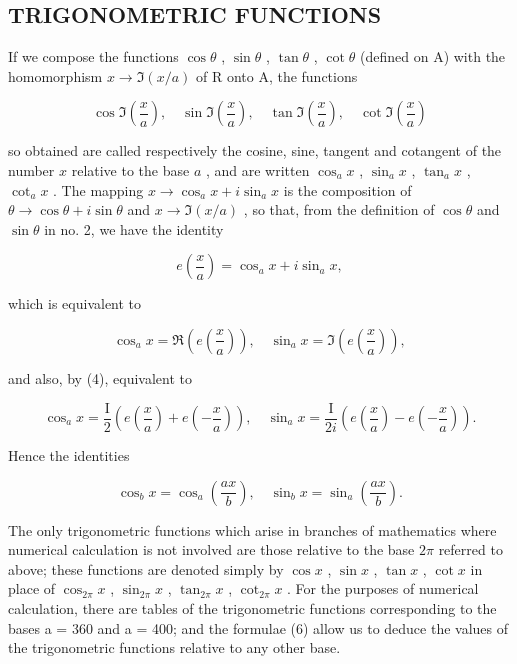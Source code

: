 \subsection{TRIGONOMETRIC FUNCTIONS}

If we compose the functions \(\cos\theta\) , \(\sin\theta\) , \(\tan\theta\) , \(\cot\theta\) (defined on A) with the homomorphism \(x\to\Im(x/a)\) of R onto A, the functions

\[
\cos \Im \left(\frac {x}{a}\right), \quad \sin \Im \left(\frac {x}{a}\right), \quad \tan \Im \left(\frac {x}{a}\right), \quad \cot \Im \left(\frac {x}{a}\right)
\]

so obtained are called respectively the cosine, sine, tangent and cotangent of the number \(x\) relative to the base \(a\) , and are written \(\cos_a x\) , \(\sin_a x\) , \(\tan_a x\) , \(\cot_a x\) . The mapping \(x \to \cos_a x + i \sin_a x\) is the composition of \(\theta \to \cos \theta + i \sin \theta\) and \(x \to \Im(x/a)\) , so that, from the definition of \(\cos \theta\) and \(\sin \theta\) in no. 2, we have the identity

\[
e \left(\frac {x}{a}\right) = \cos_ {a} x + i \sin_ {a} x,\tag{5}
\]

which is equivalent to

\[
\cos_ {a} x = \Re \left(e \left(\frac {x}{a}\right)\right), \quad \sin_ {a} x = \Im \left(e \left(\frac {x}{a}\right)\right),
\]

and also, by (4), equivalent to

\[
\cos_ {a} x = \frac {\mathrm{I}}{2} \left(e \left(\frac {x}{a}\right) + e \left(- \frac {x}{a}\right)\right), \quad \sin_ {a} x = \frac {\mathrm{I}}{2 i} \left(e \left(\frac {x}{a}\right) - e \left(- \frac {x}{a}\right)\right).
\]

Hence the identities

\[
\cos_ {b} x = \cos_ {a} \left(\frac {a x}{b}\right), \quad \sin_ {b} x = \sin_ {a} \left(\frac {a x}{b}\right).\tag{6}
\]

The only trigonometric functions which arise in branches of mathematics where numerical calculation is not involved are those relative to the base \(2\pi\) referred to above; these functions are denoted simply by \(\cos x\) , \(\sin x\) , \(\tan x\) , \(\cot x\) in place of \(\cos_{2\pi}x\) , \(\sin_{2\pi}x\) , \(\tan_{2\pi}x\) , \(\cot_{2\pi}x\) . For the purposes of numerical calculation, there are tables of the trigonometric functions corresponding to the bases a = 360 and a = 400; and the formulae (6) allow us to deduce the values of the trigonometric functions relative to any other base.

